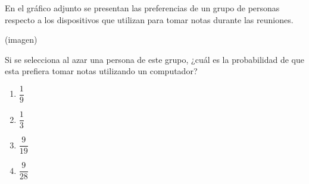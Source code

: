 \begin{problem}
    En el gráfico adjunto se presentan las preferencias de un grupo de personas respecto a los dispositivos que utilizan para tomar notas durante las reuniones.

    \begin{center}
    (imagen)
    \end{center}

    Si se selecciona al azar una persona de este grupo, ¿cuál es la probabilidad de que esta prefiera tomar notas utilizando un computador?

    \begin{enumerate}[label=\Alph*.]
        \item $\dfrac{1}{9}$
        \item $\dfrac{1}{3}$
        \item $\dfrac{9}{19}$
        \item $\dfrac{9}{28}$
    \end{enumerate}
\end{problem}
